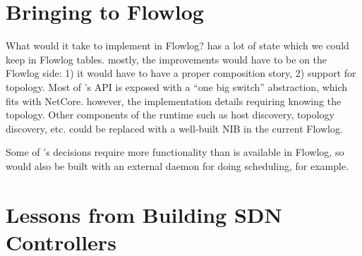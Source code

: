 \section{Bringing \sys to Flowlog}
\label{sec:pane-in-flowlog}

What would it take to implement \sys in Flowlog? \sys has a lot of state which we could keep in Flowlog tables. mostly, the improvements would have to be on the Flowlog side: 1) it would have to have a proper composition story, 2) support for topology. Most of \sys's API is exposed with a ``one big switch'' abstraction, which fits with NetCore. however, the implementation details requiring knowing the topology.  Other components of the \sys runtime such as host discovery, topology discovery, etc. could be replaced with a well-built NIB in the current Flowlog.

Some of \sys's decisions require more functionality than is available in Flowlog, so \sys would also be built with an external daemon for doing scheduling, for example.

\section{Lessons from Building SDN Controllers}
\label{sec:building-controllers}

